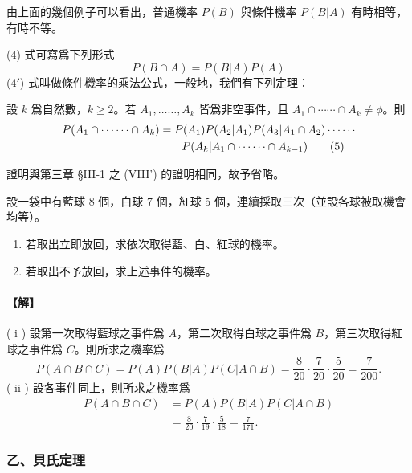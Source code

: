 由上面的幾個例子可以看出，普通機率 $P(B)$ 與條件機率 $P(B|A)$ 有時相等，有時不等。

(4) 式可寫爲下列形式
\begin{equation}\tag{$4'$}\label{eq:b5-4-4prime}
P(B \cap A) = P(B|A) P(A)
\end{equation}
($4'$) 式叫做條件機率的乘法公式，一般地，我們有下列定理：

\medskip
\begin{theorem}[*]\label{thm:b5-4-3}
設 $k$ 爲自然數，$k \ge 2$。若 $A_1, \dots\dots, A_k$ 皆爲非空事件，且 $A_1 \cap \cdots\cdots \cap A_k \neq \phi$。則
\begin{align}
P(A_1 \cap \cdots\cdots \cap A_k) &= P(A_1) P(A_2|A_1) P(A_3|A_1 \cap A_2) \cdots\cdots \notag \\
&\quad\quad P(A_k|A_1 \cap \cdots\cdots \cap A_{k-1}) \tag{5}\label{eq:b5-4-5}
\end{align}
\end{theorem}
證明與第三章 §III-1 之 (VIII') 的證明相同，故予省略。

\medskip
\begin{example}[*]\label{ex:b5-4-8}
設一袋中有藍球 8 個，白球 7 個，紅球 5 個，連續採取三次（並設各球被取機會均等）。
\begin{enumerate}[label=(\roman*), itemsep=2pt, topsep=2pt]
  \item 若取出立即放回，求依次取得藍、白、紅球的機率。
  \item 若取出不予放回，求上述事件的機率。
\end{enumerate}
\end{example}
\paragraph{【解】}
( i ) 設第一次取得藍球之事件爲 $A$，第二次取得白球之事件爲 $B$，第三次取得紅球之事件爲 $C$。則所求之機率爲
\[
P(A \cap B \cap C) = P(A) P(B|A) P(C|A \cap B) = \frac{8}{20} \cdot \frac{7}{20} \cdot \frac{5}{20} = \frac{7}{200}.
\]
( ii ) 設各事件同上，則所求之機率爲
\begin{align*}
P(A \cap B \cap C) &= P(A) P(B|A) P(C|A \cap B) \\
&= \frac{8}{20} \cdot \frac{7}{19} \cdot \frac{5}{18} = \frac{7}{171}. \tag*{\#}
\end{align*}

\subsubsection*{乙、貝氏定理}

